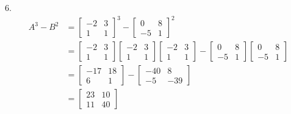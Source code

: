\documentclass[11pt]{homework}
\begin{document}
6. 
\begin{align*}
A^3 - B^2 &=
 \begin{bmatrix}
  -2 & 3 \\
  1 & 1 
 \end{bmatrix}^3
-
 \begin{bmatrix}
  0 & 8 \\
  -5 & 1 
 \end{bmatrix}^2 \\
&=
 \begin{bmatrix}
  -2 & 3 \\
  1 & 1 
 \end{bmatrix}
 \begin{bmatrix}
  -2 & 3 \\
  1 & 1 
 \end{bmatrix}
 \begin{bmatrix}
  -2 & 3 \\
  1 & 1 
 \end{bmatrix}
-
 \begin{bmatrix}
  0 & 8 \\
  -5 & 1 
 \end{bmatrix}
 \begin{bmatrix}
  0 & 8 \\
  -5 & 1 
 \end{bmatrix} \\
&=
 \begin{bmatrix}
  -17 & 18 \\
  6 & 1 
 \end{bmatrix}
-
 \begin{bmatrix}
  -40 & 8 \\
  -5 & -39
 \end{bmatrix} \\
&=
 \begin{bmatrix}
  23 & 10 \\
  11 & 40
 \end{bmatrix}
\end{align*}
\end{document}
